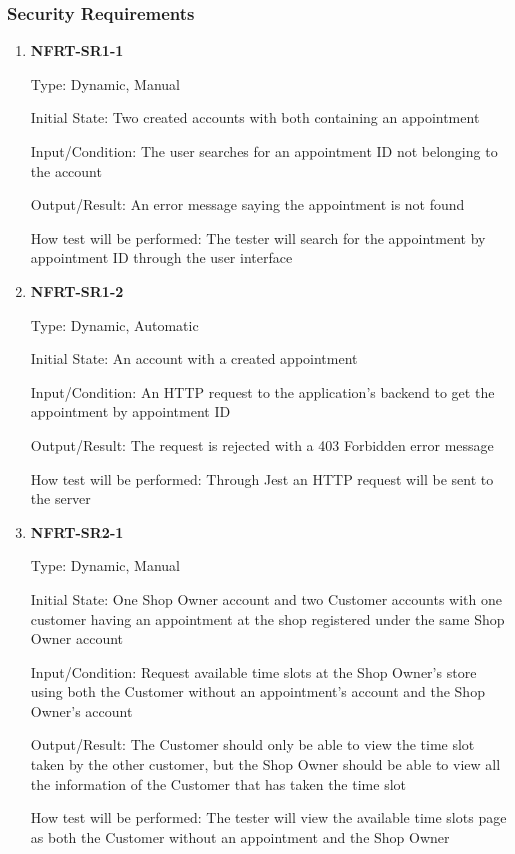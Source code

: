 \documentclass[12pt, titlepage]{article}
\begin{document}
\subsubsection{Security Requirements}
\begin{enumerate}

	\item \textbf{NFRT-SR1-1}

	      Type: Dynamic, Manual

	      Initial State: Two created accounts with both containing an appointment

	      Input/Condition: The user searches for an appointment ID not belonging to the account

	      Output/Result: An error message saying the appointment is not found

	      How test will be performed: The tester will search for the appointment by appointment ID through
	      the user interface

	\item \textbf{NFRT-SR1-2}

	      Type: Dynamic, Automatic

	      Initial State: An account with a created appointment

	      Input/Condition: An HTTP request to the application's backend to get the appointment by appointment
	      ID

	      Output/Result: The request is rejected with a 403 Forbidden error message

	      How test will be performed: Through Jest an HTTP request will be sent to the server

	\item \textbf{NFRT-SR2-1}

	      Type: Dynamic, Manual

	      Initial State: One Shop Owner account and two Customer accounts with one customer having an
	      appointment at the shop registered under the same Shop Owner account

	      Input/Condition: Request available time slots at the Shop Owner's store using both the Customer
	      without an appointment's account and the Shop Owner's account

	      Output/Result: The Customer should only be able to view the time slot taken by the other customer,
	      but the Shop Owner should be able to view all the information of the Customer that has taken the
	      time slot

	      How test will be performed: The tester will view the available time slots page as both the Customer
	      without an appointment and the Shop Owner


\end{enumerate}
\end{document}
